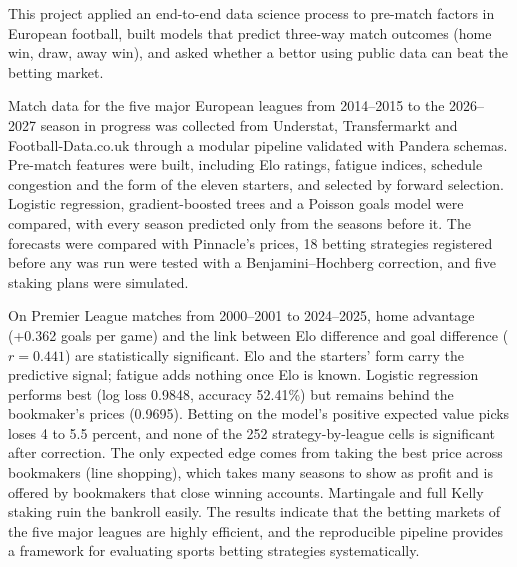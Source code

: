 
This project applied an end-to-end data science process to pre-match factors in European football, built models that predict three-way match outcomes (home win, draw, away win), and asked whether a bettor using public data can beat the betting market.

Match data for the five major European leagues from 2014--2015 to the 2026--2027 season in progress was collected from Understat, Transfermarkt and Football-Data.co.uk through a modular pipeline validated with Pandera schemas. Pre-match features were built, including Elo ratings, fatigue indices, schedule congestion and the form of the eleven starters, and selected by forward selection. Logistic regression, gradient-boosted trees and a Poisson goals model were compared, with every season predicted only from the seasons before it. The forecasts were compared with Pinnacle's prices, 18 betting strategies registered before any was run were tested with a Benjamini--Hochberg correction, and five staking plans were simulated.

On Premier League matches from 2000--2001 to 2024--2025, home advantage (+0.362 goals per game) and the link between Elo difference and goal difference ($r = 0.441$) are statistically significant. Elo and the starters' form carry the predictive signal; fatigue adds nothing once Elo is known. Logistic regression performs best (log loss 0.9848, accuracy 52.41\%) but remains behind the bookmaker's prices (0.9695). Betting on the model's positive expected value picks loses 4 to 5.5 percent, and none of the 252 strategy-by-league cells is significant after correction. The only expected edge comes from taking the best price across bookmakers (line shopping), which takes many seasons to show as profit and is offered by bookmakers that close winning accounts. Martingale and full Kelly staking ruin the bankroll easily. The results indicate that the betting markets of the five major leagues are highly efficient, and the reproducible pipeline provides a framework for evaluating sports betting strategies systematically.
